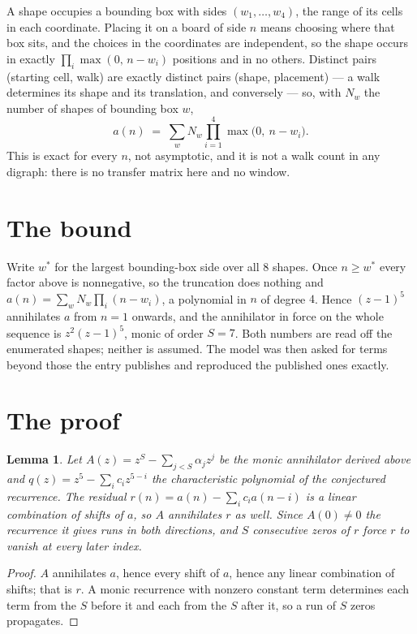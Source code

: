 \documentclass[11pt,a4paper]{article}
\theoremstyle{plain}
\newtheorem{lemma}[theorem]{Lemma}
\theoremstyle{definition}
\begin{document}
A shape occupies a bounding box with sides $(w_1,\dots,w_{4})$, the range of its cells in each
coordinate. Placing it on a board of side $n$ means choosing where that box sits, and the
choices in the coordinates are independent, so the shape occurs in exactly
$\prod_{i}\max(0,\,n-w_i)$ positions and in no others. Distinct pairs (starting cell,
walk) are exactly distinct pairs (shape, placement) --- a walk determines its shape and its
translation, and conversely --- so, with $N_w$ the number of shapes of bounding box $w$,
\[
a(n)\;=\;\sum_{w} N_w \prod_{i=1}^{4}\max\bigl(0,\ n-w_i\bigr).
\]
This is exact for every $n$, not asymptotic, and it is not a walk count in any digraph: there is
no transfer matrix here and no window.

\section{The bound}

Write $w^\ast$ for the largest bounding-box side over all $8$ shapes. Once $n\ge w^\ast$
every factor above is nonnegative, so the truncation does nothing and
$a(n)=\sum_w N_w\prod_i(n-w_i)$, a polynomial in $n$ of degree $4$. Hence $(z-1)^{5}$
annihilates $a$ from $n=1$ onwards, and the annihilator in force on the whole sequence is
$z^{2}(z-1)^{5}$, monic of order $S=7$. Both numbers are read off the enumerated
shapes; neither is assumed. The model was then asked for terms beyond those the entry publishes
and reproduced the published ones exactly.

\section{The proof}

\begin{lemma}\label{lem:crit}
Let $A(z)=z^S-\sum_{j<S}\alpha_jz^{j}$ be the monic annihilator derived above and
$q(z)=z^{5}-\sum_ic_iz^{5-i}$ the characteristic polynomial of the conjectured
recurrence. The residual $r(n)=a(n)-\sum_ic_ia(n-i)$ is a linear combination of shifts of $a$,
so $A$ annihilates $r$ as well. Since $A(0)\ne0$ the recurrence it gives runs in both
directions, and $S$ consecutive zeros of $r$ force $r$ to vanish at every later index.
\end{lemma}

\begin{proof}
$A$ annihilates $a$, hence every shift of $a$, hence any linear combination of shifts; that is
$r$. A monic recurrence with nonzero constant term determines each term from the $S$ before it
and each from the $S$ after it, so a run of $S$ zeros propagates.
\end{proof}
\end{document}

